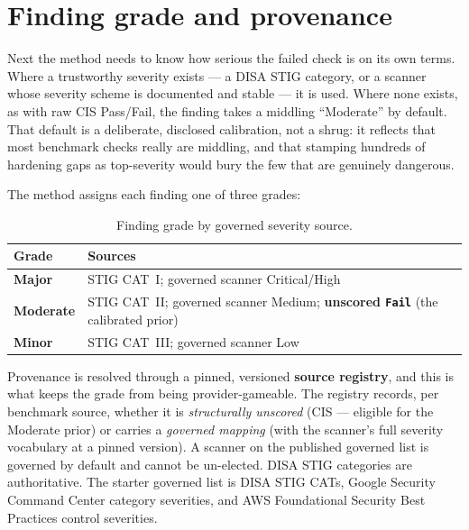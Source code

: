 \documentclass[11pt]{article}
\newcommand{\code}[1]{\texttt{#1}}
\begin{document}
\section{Finding grade and provenance}
\label{sec:grade}
\begin{plain}
Next the method needs to know how serious the failed check is on its own terms. Where
a trustworthy severity exists --- a DISA STIG category, or a scanner whose severity
scheme is documented and stable --- it is used. Where none exists, as with raw CIS
Pass/Fail, the finding takes a middling ``Moderate'' by default. That default is a
deliberate, disclosed calibration, not a shrug: it reflects that most benchmark
checks really are middling, and that stamping hundreds of hardening gaps as
top-severity would bury the few that are genuinely dangerous.
\end{plain}

The method assigns each finding one of three grades:

\begin{table}[H]
\centering
\renewcommand{\arraystretch}{1.25}
\begin{tabular}{>{\raggedright\arraybackslash}p{} >{\raggedright\arraybackslash}p{}}
\toprule
\textbf{Grade} & \textbf{Sources} \\
\midrule
\textbf{Major} & STIG CAT~I; governed scanner Critical/High \\
\textbf{Moderate} & STIG CAT~II; governed scanner Medium; \textbf{unscored \code{Fail}} (the calibrated prior) \\
\textbf{Minor} & STIG CAT~III; governed scanner Low \\
\bottomrule
\end{tabular}
\caption{Finding grade by governed severity source.}
\label{tab:grade}
\end{table}

Provenance is resolved through a pinned, versioned \textbf{source registry}, and this
is what keeps the grade from being provider-gameable. The registry records, per
benchmark source, whether it is \emph{structurally unscored} (CIS --- eligible for
the Moderate prior) or carries a \emph{governed mapping} (with the scanner's full
severity vocabulary at a pinned version). A scanner on the published governed list is
governed by default and cannot be un-elected. DISA STIG categories are authoritative.
The starter governed list is DISA STIG CATs, Google Security Command Center category
severities, and AWS Foundational Security Best Practices control severities.
\end{document}
